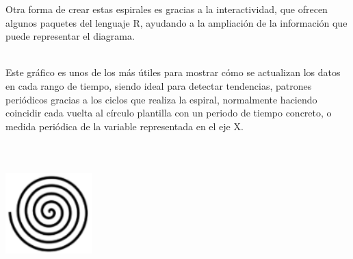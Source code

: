 \documentclass{article}\usepackage[]{graphicx}\usepackage[]{color}
\begin{document}
Otra forma de crear estas espirales es gracias a la interactividad, que ofrecen algunos paquetes del lenguaje R, ayudando a la ampliaci\'on de la informaci\'on que puede representar el diagrama\cite{espiral_inte}.~\\~\par
Este gr\'afico es unos de los m\'as \'utiles para mostrar c\'omo se actualizan los datos en cada rango de tiempo, siendo ideal para detectar tendencias, patrones peri\'odicos gracias a los ciclos que realiza la espiral, normalmente haciendo coincidir cada vuelta al c\'irculo plantilla con un periodo de tiempo concreto, o medida peri\'odica de la variable representada en el eje X.
~\\~\\~\\~\\
\vbox{
    \centering
    \includegraphics[width=0.25\textwidth]{imag/espiral}
}
\clearpage
\end{document}
